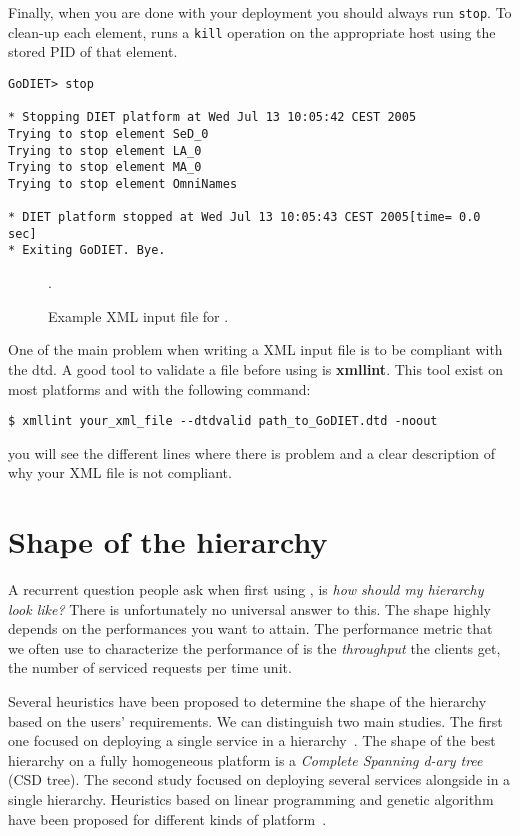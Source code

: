 Finally, when you are done with your \diet deployment you should always run
\texttt{stop}. To clean-up each element, \godiet runs a \texttt{kill} operation
on the appropriate host using the stored PID of that element.

\begin{verbatim}
GoDIET> stop

* Stopping DIET platform at Wed Jul 13 10:05:42 CEST 2005
Trying to stop element SeD_0
Trying to stop element LA_0
Trying to stop element MA_0
Trying to stop element OmniNames

* DIET platform stopped at Wed Jul 13 10:05:43 CEST 2005[time= 0.0 sec]
* Exiting GoDIET. Bye.
\end{verbatim}

\begin{figure}[p]
.
\caption{Example XML input file for \godiet.\label{fig:godietXml}}
\end{figure}

One of the main problem when writing a \godiet XML input file is to be compliant
with the dtd. A good tool to validate a \godiet file before using \godiet is
\textbf{xmllint}. This tool exist on most platforms and with the following
command:
\begin{verbatim}
$ xmllint your_xml_file --dtdvalid path_to_GoDIET.dtd -noout
\end{verbatim}
you will see the different lines where there is problem and a clear description
of why your XML file is not compliant.

\clearpage

\section{Shape of the hierarchy}

A recurrent question people ask when first using \diet, is \emph{how should my
  hierarchy look like?} There is unfortunately no universal answer to
this. The shape highly depends on the performances you want \diet to
attain. The performance metric that we often use to characterize the
performance of \diet is the \emph{throughput} the clients get, \ie the number
of serviced requests per time unit. 

Several heuristics have been proposed to determine the shape of the hierarchy
based on the users' requirements. We can distinguish two main studies. The
first one focused on deploying a single service in a \diet
hierarchy~\cite{InProceedingsCaron.CCD_08,InProceedingsCaron.CCL_04}. The shape
of the best hierarchy on a fully homogeneous platform is a \emph{Complete
Spanning d-ary tree} (CSD tree). The second study focused on deploying several
services alongside in a single hierarchy. Heuristics based on linear
programming and genetic algorithm have been proposed for different kinds of
platform~\cite{CARON:2010:INRIA-00490406:1,CARON:2010:INRIA-00456045:3}.

